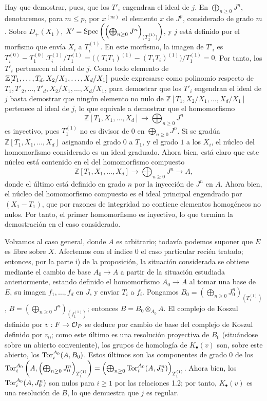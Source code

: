 Hay que demostrar, pues, que los \(T'_i\) engendran el ideal de \(j\). En \(\bigoplus_{n\ge0}J^n\), denotaremos, para \(m\le p\), por \(x^{(m)}\) el elemento \(x\) de \(J^p\), considerado de grado \(m\). Sobre \(D_+(X_1)\), \(X'=\Spec\left(\left(\bigoplus_{n\ge0}J^n\right)_{(T_1^{(1)})}\right)\), y \(j\) está definido por el morfismo que envía \(X_i\) a \(T_i^{(1)}\). En este morfismo, la imagen de \(T'_i\) es \(T_i^{(0)}-T_1^{(0)}.T_i^{(1)}/T_1^{(1)}=\bigl((T_iT_1)^{(1)}-(T_1T_i)^{(1)}\bigr)/T_1^{(1)}=0\). Por tanto, los \(T'_i\) pertenecen al ideal de \(j\). Como todo elemento de \(\sisi{\mathbb Z[T_1,\ldots,T_d,X_2/X_1,\ldots,X_d,X_1]}{\mathbb Z[T_1,\ldots,T_d,X_2/X_1,\ldots,X_d/X_1]}\) puede expresarse como polinomio respecto de \(T_1,T'_2,\ldots,T'_d,X_2/X_1,\ldots,X_d/X_1\), para demostrar que los \(T'_i\) engendran el ideal de \(j\) basta demostrar que ningún elemento no nulo de \(\mathbb Z[T_1,X_2/X_1,\ldots,X_d/X_1]\) pertenece al ideal de \(j\), lo que equivale a demostrar que el homomorfismo
\[
\mathbb Z[T_1,X_1,\ldots,X_d]\longrightarrow\bigoplus_{n\ge0}J^n
\]
es inyectivo, pues \(T_1^{(1)}\) no es divisor de 0 en \(\bigoplus_{n\ge0}J^n\). Si se gradúa \(\mathbb Z[T_1,X_1,\ldots,X_d]\) asignando el grado \(0\) a \(T_1\), y el grado \(1\) a los \(X_i\), el núcleo del homomorfismo considerado es un ideal graduado. Ahora bien, está claro que este núcleo está contenido en el del homomorfismo compuesto
\[
\mathbb Z[T_1,X_1,\ldots,X_d]\longrightarrow
\bigoplus_{n\ge0}J^n\longrightarrow A,
\]
donde el último está definido en grado \(n\) por la inyección de \(J^n\) en \(A\). Ahora bien, el núcleo del homomorfismo compuesto es el ideal principal engendrado por \((X_1-T_1)\), que por razones de integridad no contiene elementos homogéneos no nulos. Por tanto, el primer homomorfismo es inyectivo, lo que termina la demostración en el caso considerado.

Volvamos al caso general, donde \(A\) es arbitrario; todavía podemos suponer que \(E\) es libre sobre \(X\). Afectemos con el índice \(0\) el caso particular recién tratado; entonces, por la parte i) de la proposición, la situación considerada se obtiene mediante el cambio de base \(A_0\to A\) a partir de la situación estudiada anteriormente, estando definido el homomorfismo \(A_0\to A\) al tomar una base de \(E\), su imagen \(f_1,\ldots,f_d\) en \(J\), y enviar \(T_i\) a \(f_i\). Pongamos \(B_0=\left(\bigoplus_{n\ge0}J_0^n\right)_{(T_1^{(1)})}\), \(B=\left(\bigoplus_{n\ge0}J^n\right)_{(f_1^{(1)})}\); entonces \(B=B_0\otimes_{A_0}A\). El complejo de Koszul definido por \(v:F\to\cO_P\) se deduce por cambio de base del complejo de Koszul definido por \(v_0\); como este último es una resolución proyectiva de \(B_0\) (situándose sobre un abierto conveniente), los grupos de homología de \(K_\bullet(v)\) son, sobre este abierto, los \(\Tor_i^{A_0}(A,B_0)\). Estos últimos son las componentes de grado \(0\) de los \(\Tor_i^{A_0}\left(A,\left(\bigoplus_{n\ge0}J_0^n\right)_{T_1^{(1)}}\right)=\left(\bigoplus_{n\ge0}\Tor_i^{A_0}(A,J_0^n)\right)_{T_1^{(1)}}\). Ahora bien, los \(\Tor_i^{A_0}(A,J_0^n)\) son nulos para \(i\ge1\) por las relaciones 1.2; por tanto, \(K_\bullet(v)\) es una resolución de \(B\), lo que demuestra que \(j\) es regular.

